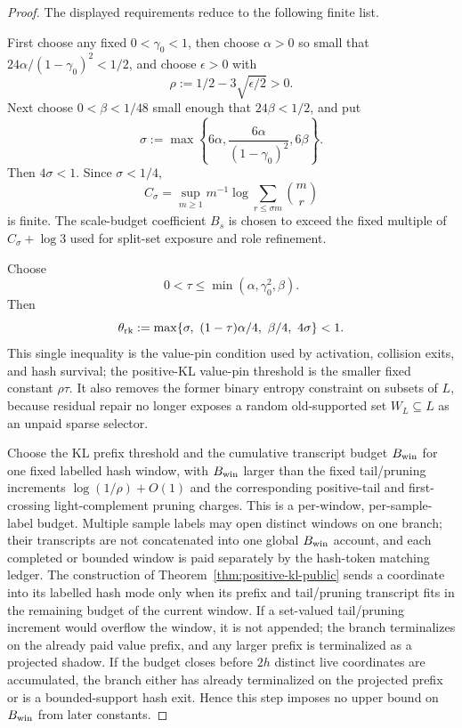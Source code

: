 \documentclass[11pt]{article}
\begin{document}
\begin{proof}
The displayed requirements reduce to the following finite list.

First choose any fixed $0<\gamma_0<1$, then choose $\alpha>0$ so small that
$24\alpha/(1-\gamma_0)^2<1/2$, and choose $\epsilon>0$ with
\[
  \rho:=1/2-3\sqrt{\epsilon/2}>0 .
\]
Next choose $0<\beta<1/48$ small enough that $24\beta<1/2$, and put
\[
  \sigma:=\max\left\{6\alpha,\frac{6\alpha}{(1-\gamma_0)^2},6\beta\right\}.
\]
Then $4\sigma<1$.  Since $\sigma<1/4$,
\[
  C_\sigma=\sup_{m\ge1}m^{-1}
  \log\sum_{r\le\sigma m}\binom mr
\]
is finite.  The scale-budget coefficient $B_s$ is chosen to exceed the fixed
multiple of $C_\sigma+\log 3$ used for split-set exposure and role
refinement.

Choose
\[
  0<\tau\le\min(\alpha,\gamma_0^2,\beta).
\]
Then
\[
  \theta_{\rm rk}:=\max\{\sigma,\ (1-\tau)\alpha/4,\ \beta/4,\ 4\sigma\}<1 .
\]
This single inequality is the value-pin condition used by activation,
collision exits, and hash survival; the positive-KL value-pin threshold is
the smaller fixed constant $\rho\tau$.  It also removes the former binary
entropy constraint on subsets of $L$, because residual repair no longer
exposes a random old-supported set $W_L\subseteq L$ as an unpaid sparse
selector.

Choose the KL prefix threshold and the cumulative transcript budget
$B_{\rm win}$ for one fixed labelled hash window, with $B_{\rm win}$ larger than the
fixed tail/pruning increments $\log(1/\rho)+O(1)$ and the corresponding
positive-tail and first-crossing light-complement pruning charges.  This is a
per-window, per-sample-label budget.  Multiple sample labels may open distinct
windows on one branch; their transcripts are not concatenated into one global
$B_{\rm win}$ account, and each completed or bounded window is paid separately
by the hash-token matching ledger.  The construction of
Theorem~\ref{thm:positive-kl-public} sends a coordinate into its labelled hash mode only
when its prefix and tail/pruning transcript fits in the remaining budget of
the current window.  If a set-valued tail/pruning increment would overflow the
window, it is not appended; the branch terminalizes on the already paid value
prefix, and any larger prefix is terminalized as a projected shadow.
If the budget closes before $2h$ distinct live coordinates are accumulated,
the branch either has already terminalized on the projected prefix or is a
bounded-support hash exit.  Hence this step imposes no upper bound on
$B_{\rm win}$ from later constants.


\end{proof}
\end{document}
